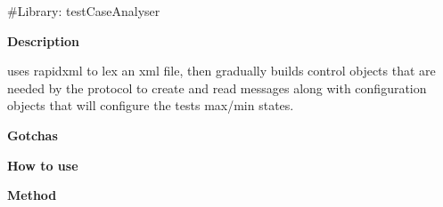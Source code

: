 \#\+Library\+: test\+Case\+Analyser

{\bfseries{Description}}

uses rapidxml to lex an xml file, then gradually builds control objects that are needed by the protocol to create and read messages along with configuration objects that will configure the tests max/min states.

{\bfseries{Gotchas}}

{\bfseries{How to use}}

{\bfseries{Method}} 